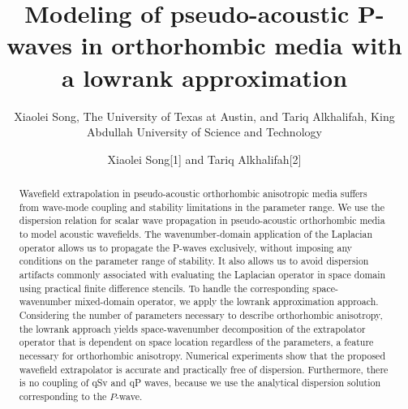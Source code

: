 
\title{Modeling of pseudo-acoustic P-waves in orthorhombic media with a lowrank approximation}
\author{Xiaolei Song, The University of Texas at Austin, and
Tariq Alkhalifah, King Abdullah University of Science and Technology
}
\maketitle
\renewcommand{\footnotemark}{} 

\author{Xiaolei Song\footnotemark[1] and Tariq Alkhalifah\footnotemark[2] 
}

\address{
\footnotemark[1]Bureau of Economic Geology \\
Jackson School of Geosciences \\
The University of Texas at Austin \\
University Station, Box X \\
Austin, TX 78713-8924 \\
USA\\
songxl@utexas.edu\\
\footnotemark[2]Physical Sciences and Engineering \\
King Abdullah University of Science and Technology \\
Mail box \# 1280 \\ 
Thuwal 23955-6900 \\
Saudi Arabia\\
tariq.alkhalifah@kaust.edu.sa
}


\begin{abstract}
Wavefield extrapolation in pseudo-acoustic orthorhombic anisotropic media suffers from 
wave-mode coupling and stability limitations in the parameter range.
We use the dispersion relation for scalar wave propagation in pseudo-acoustic orthorhombic media to model
acoustic wavefields. The wavenumber-domain application of the Laplacian operator allows us to propagate the P-waves exclusively,
without imposing any conditions on the parameter range of stability. It also allows us to avoid dispersion artifacts commonly associated
with evaluating the Laplacian operator in space domain using practical finite difference stencils.
To handle the corresponding space-wavenumber mixed-domain operator,
we apply the lowrank approximation approach. Considering the number of parameters necessary to describe orthorhombic anisotropy,
the lowrank approach yields space-wavenumber decomposition of the extrapolator operator that is dependent on space location regardless of the parameters,
a feature necessary for orthorhombic anisotropy.
Numerical experiments show that the proposed wavefield extrapolator is accurate and practically free of dispersion.
Furthermore, there is no coupling of qSv and qP waves,
because we use the analytical dispersion solution corresponding to the $P$-wave. 
\end{abstract}

